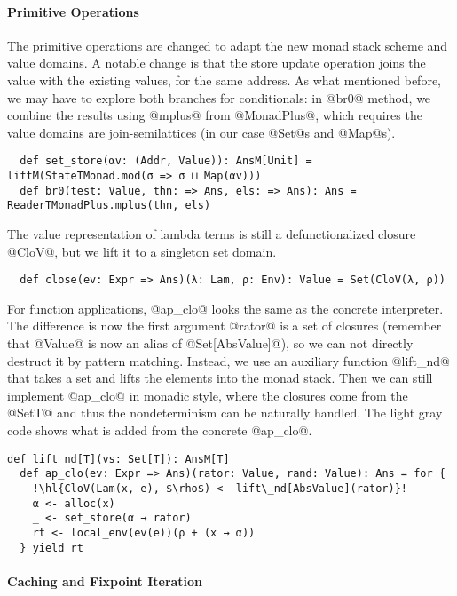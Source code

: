 \paragraph{Primitive Operations} The primitive operations are changed to adapt
the new monad stack scheme and value domains. A notable change is that the store
update operation joins the value with the existing values, for the same address.
As what mentioned before, we may have to explore both branches for conditionals:
in @br0@ method, we combine the results using @mplus@ from @MonadPlus@, which
requires the value domains are join-semilattices (in our case @Set@s and
@Map@s).
\begin{lstlisting}
  def set_store(αv: (Addr, Value)): AnsM[Unit] = liftM(StateTMonad.mod(σ => σ ⊔ Map(αv)))
  def br0(test: Value, thn: => Ans, els: => Ans): Ans = ReaderTMonadPlus.mplus(thn, els)
\end{lstlisting}

The value representation of lambda terms is still a defunctionalized closure
@CloV@, but we lift it to a singleton set domain.
\begin{lstlisting}
  def close(ev: Expr => Ans)(λ: Lam, ρ: Env): Value = Set(CloV(λ, ρ))
\end{lstlisting}

For function applications, @ap_clo@ looks the same as the concrete interpreter.
The difference is now the first argument @rator@ is a set of closures (remember
that @Value@ is now an alias of @Set[AbsValue]@), so we can not directly
destruct it by pattern matching. Instead, we use an auxiliary function @lift_nd@
that takes a set and lifts the elements into the monad stack. Then we can still
implement @ap_clo@ in monadic style, where the closures come from the @SetT@ and
thus the nondeterminism can be naturally handled. The light gray code shows what
is added from the concrete @ap_clo@.
\begin{lstlisting}[escapechar=!]
  def lift_nd[T](vs: Set[T]): AnsM[T]
  def ap_clo(ev: Expr => Ans)(rator: Value, rand: Value): Ans = for {
    !\hl{CloV(Lam(x, e), $\rho$) <- lift\_nd[AbsValue](rator)}!
    α <- alloc(x)
    _ <- set_store(α → rator)
    rt <- local_env(ev(e))(ρ + (x → α))
  } yield rt
\end{lstlisting}


\paragraph{Caching and Fixpoint Iteration}

